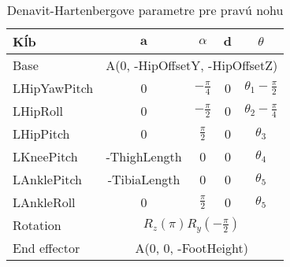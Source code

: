 \begin{table}[H]
	\centering
	\caption{Denavit-Hartenbergove parametre pre pravú nohu}
	\begin{tabular}{|l|c|c|c|c|}
	\hline
	\textbf{Kĺb} & $\textbf{a}$ & $\mathbb{\alpha}$ & $\textbf{d}$ & $\theta$ \\
	\hline
	Base & \multicolumn{4}{|c|}{A(0, -HipOffsetY, -HipOffsetZ)} \\
	\hline
	LHipYawPitch & 0 & $-\frac{\pi}{4}$ & 0 & $\theta_1 - \frac{\pi}{2}$ \\
	\hline
	LHipRoll & 0 & $-\frac{\pi}{2}$ & 0 &  $\theta_2 - \frac{\pi}{4}$ \\
	\hline
	LHipPitch & 0 & $\frac{\pi}{2}$ & 0 & $\theta_3$ \\
	\hline
	LKneePitch & -ThighLength & 0 & 0 & $\theta_4$ \\
	\hline 
	LAnklePitch & -TibiaLength & 0 & 0 & $\theta_5$ \\
	\hline
	LAnkleRoll & 0 & $\frac{\pi}{2}$ & 0 & $\theta_5$ \\
	\hline
	Rotation & \multicolumn{4}{|c|}{$R_z\left(\pi\right)R_y\left(-\frac{\pi}{2}\right)$} \\
	\hline
	End effector & \multicolumn{4}{|c|}{A(0, 0, -FootHeight)} \\
	\hline
	\end{tabular}
\end{table}